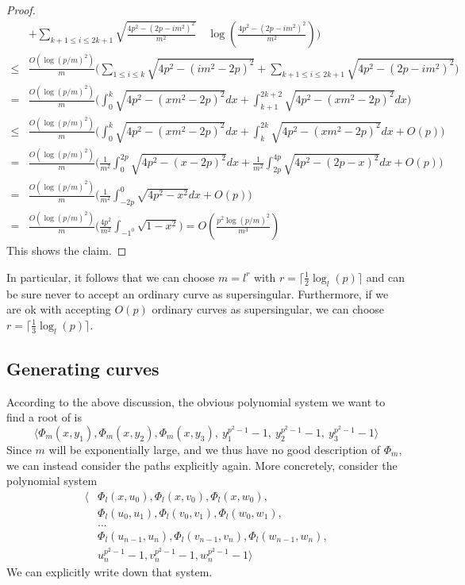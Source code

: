 \begin{proof}
\begin{align*}
        &+ \sum_{k + 1 \leq i \leq 2k + 1} \sqrt{ \frac {4p^2 - (2p - im^2)^2} {m^2}} \quad \log\left( \frac {4p^2 - (2p - im^2)^2} {m^2} \right) \Biggr) \\
        \leq& \frac {O(\log(p/m)^2)} {m} \Biggl( \sum_{1 \leq i \leq k} \sqrt{4p^2 - (im^2 - 2p)^2} + \sum_{k + 1 \leq i \leq 2k + 1} \sqrt{4p^2 - (2p - im^2)^2} \Biggr) \\
        =& \frac {O(\log(p/m)^2)} {m} \Biggl( \int_0^k \sqrt{4p^2 - (xm^2 - 2p)^2} dx + \int_{k + 1}^{2k + 2} \sqrt{4p^2 - (xm^2 - 2p)^2} dx \Biggr) \\
        \leq& \frac {O(\log(p/m)^2)} {m} \Biggl( \int_0^k \sqrt{4p^2 - (xm^2 - 2p)^2} dx + \int_{k}^{2k} \sqrt{4p^2 - (xm^2 - 2p)^2} dx + O(p) \Biggr) \\
        =& \frac {O(\log(p/m)^2)} {m} \Biggl( \frac 1 {m^2} \int_0^{2p} \sqrt{4p^2 - (x - 2p)^2} dx + \frac 1 {m^2} \int_{2p}^{4p } \sqrt{4p^2 - (2p - x)^2} dx + O(p)\Biggr) \\
        =& \frac {O(\log(p/m)^2)} {m} \Biggl( \frac 1 {m^2} \int_{-2p}^0 \sqrt{4p^2 - x^2} dx + O(p) \Biggr) \\
        =& \frac {O(\log(p/m)^2)} {m} \Biggl( \frac {4p^2} {m^2} \int_{-1^0} \sqrt{1 - x^2} \Biggr) = O\left( \frac {p^2\log(p/m)^2} {m^3} \right)
    \end{align*}
    This shows the claim.
\end{proof}
In particular, it follows that we can choose $m = l^r$ with $r = \lceil \frac 1 2 \log_l(p) \rceil$ and can be sure never to accept an ordinary curve as supersingular.
Furthermore, if we are ok with accepting $O(p)$ ordinary curves as supersingular, we can choose $r = \lceil \frac 1 3 \log_l(p) \rceil$.

\subsection{Generating curves}
According to the above discussion, the obvious polynomial system we want to find a root of is
\begin{equation*}
    \langle \Phi_m(x, y_1), \Phi_m(x, y_2), \Phi_m(x, y_3), \ y_1^{p^2 - 1} - 1, \ y_2^{p^2 - 1} - 1, \ y_3^{p^2 - 1} - 1 \rangle
\end{equation*}
Since $m$ will be exponentially large, and we thus have no good description of $\Phi_m$, we can instead consider the paths explicitly again.
More concretely, consider the polynomial system
\begin{align*}
    \langle &\Phi_l(x, u_0), \Phi_l(x, v_0), \Phi_l(x, w_0), \\
    &\Phi_l(u_0, u_1), \Phi_l(v_0, v_1), \Phi_l(w_0, w_1), \\
    &... \\
    &\Phi_l(u_{n - 1}, u_n), \Phi_l(v_{n - 1}, v_n), \Phi_l(w_{n - 1}, w_n), \\
    &u_n^{p^2 - 1} - 1, v_n^{p^2 - 1} - 1, w_n^{p^2 - 1} - 1 \rangle
\end{align*}
We can explicitly write down that system.

